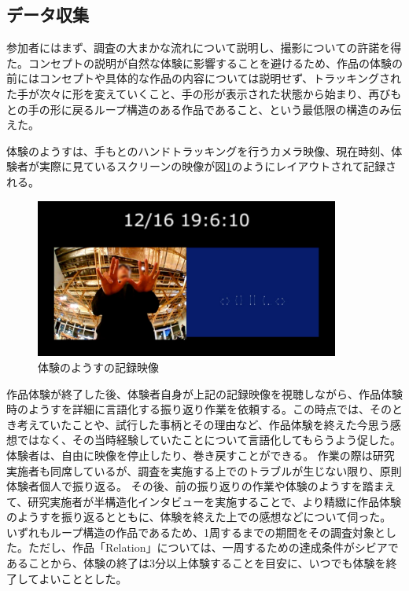 \subsection{データ収集}
参加者にはまず、調査の大まかな流れについて説明し、撮影についての許諾を得た。コンセプトの説明が自然な体験に影響することを避けるため、作品の体験の前にはコンセプトや具体的な作品の内容については説明せず、トラッキングされた手が次々に形を変えていくこと、手の形が表示された状態から始まり、再びもとの手の形に戻るループ構造のある作品であること、という最低限の構造のみ伝えた。

体験のようすは、手もとのハンドトラッキングを行うカメラ映像、現在時刻、体験者が実際に見ているスクリーンの映像が図\ref{fig:record_monitor}のようにレイアウトされて記録される。

\begin{figure}[H]
  \centering
  \includegraphics[width=10cm]{img/record_monitor.jpg}
  \caption{体験のようすの記録映像}
  \label{fig:record_monitor}
\end{figure}

作品体験が終了した後、体験者自身が上記の記録映像を視聴しながら、作品体験時のようすを詳細に言語化する振り返り作業を依頼する。この時点では、そのとき考えていたことや、試行した事柄とその理由など、作品体験を終えた今思う感想ではなく、その当時経験していたことについて言語化してもらうよう促した。体験者は、自由に映像を停止したり、巻き戻すことができる。
作業の際は研究実施者も同席しているが、調査を実施する上でのトラブルが生じない限り、原則体験者個人で振り返る。
その後、前の振り返りの作業や体験のようすを踏まえて、研究実施者が半構造化インタビューを実施することで、より精緻に作品体験のようすを振り返るとともに、体験を終えた上での感想などについて伺った。
いずれもループ構造の作品であるため、1周するまでの期間をその調査対象とした。ただし、作品「Relation」については、一周するための達成条件がシビアであることから、体験の終了は3分以上体験することを目安に、いつでも体験を終了してよいこととした。

